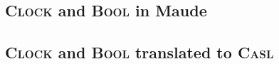 \documentclass[11pt]{article}
\newcommand{\Casl}{\textsc{Casl}}
\begin{document}
\subsection{\textsc{Clock} and \textsc{Bool} in Maude}
\label{sub:example_clock_maude}
\begin{alltt}\small{}\end{alltt}
\begin{alltt}\small{}\end{alltt}

\subsection{\textsc{Clock} and \textsc{Bool} translated to \Casl{}}
\label{sub:example_clock_casl}



\clearpage
\thispagestyle{plain}
\listoffigures

\clearpage
\pagestyle{plain}


\end{document}
